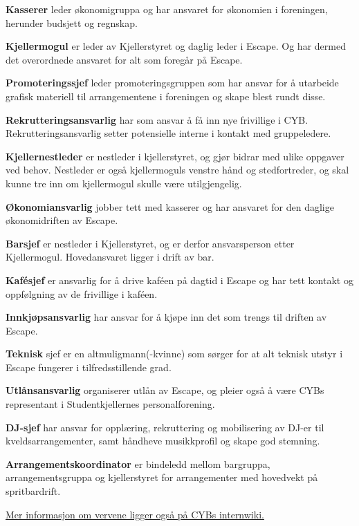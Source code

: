 \documentclass[12pt, norsk, a4paper]{proc}
\begin{document}
\textbf{Kasserer} leder økonomigruppa og har ansvaret for økonomien i foreningen, herunder
budsjett og regnskap.

\textbf{Kjellermogul} er leder av Kjellerstyret og daglig leder i
Escape. Og har dermed det overordnede ansvaret for alt som foregår på
Escape.

\textbf{Promoteringssjef} leder promoteringsgruppen som har ansvar for å
utarbeide grafisk materiell til arrangementene i foreningen og skape
blest rundt disse.

\textbf{Rekrutteringsansvarlig} har som ansvar å få inn nye frivillige i
CYB. Rekrutteringsansvarlig setter potensielle interne i kontakt med
gruppeledere.

\textbf{Kjellernestleder} er nestleder i kjellerstyret, og gjør bidrar
med ulike oppgaver ved behov. Nestleder er også kjellermoguls venstre
hånd og stedfortreder, og skal kunne tre inn om kjellermogul skulle være
utilgjengelig.

\textbf{Økonomiansvarlig} jobber tett med kasserer og har ansvaret for
den daglige økonomidriften av Escape.

\textbf{Barsjef} er nestleder i Kjellerstyret, og er derfor
ansvarsperson etter Kjellermogul. Hovedansvaret ligger i drift av bar.

\textbf{Kafésjef} er ansvarlig for å drive kaféen på dagtid i Escape og
har tett kontakt og oppfølgning av de frivillige i kaféen.

\textbf{Innkjøpsansvarlig} har ansvar for å kjøpe inn det som trengs til
driften av Escape.

\textbf{Teknisk} sjef er en altmuligmann(-kvinne) som sørger for at alt
teknisk utstyr i Escape fungerer i tilfredsstillende grad.

\textbf{Utlånsansvarlig} organiserer utlån av Escape, og pleier også å
være CYBs representant i Studentkjellernes personalforening.

\textbf{DJ-sjef} har ansvar for opplæring, rekruttering og mobilisering
av DJ-er til kveldsarrangementer, samt håndheve musikkprofil og skape
god stemning.

\textbf{Arrangementskoordinator} er bindeledd mellom bargruppa,
arrangementsgruppa og kjellerstyret for arrangementer med hovedvekt på
spritbardrift.

\href{https://wiki.cyb.no/display/AKTIV/Vervoversikt}{Mer informasjon om vervene ligger også på CYBs internwiki.}
\end{document}
